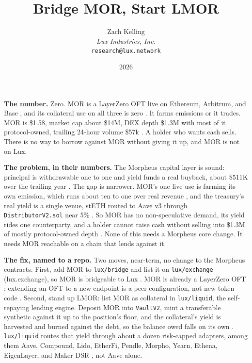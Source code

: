 \documentclass[11pt,a4paper]{article}
\title{Bridge MOR, Start LMOR}
\author{Zach Kelling\\\textit{Lux Industries, Inc.}\\\texttt{research@lux.network}}
\date{2026}
\newcommand{\code}[1]{\texttt{\small #1}}
\newcommand{\prov}[1]{{\color{muted}\scriptsize\sffamily[#1]}}
\begin{document}
\luxcoverpage
\sloppy

\par
\vspace{0.9ex}

\noindent\textbf{The number.}
Zero. MOR is a LayerZero OFT live on Ethereum, Arbitrum, and Base \prov{verified}, and its
collateral use on all three is zero \prov{verified}. It farms emissions or it trades. MOR is
\$1.58, market cap about \$14M, DEX depth \$1.3M with most of it protocol-owned, trailing
24-hour volume \$57k \prov{verified}. A holder who wants cash sells. There is no way to borrow
against MOR without giving it up, and MOR is not on Lux.

\vspace{0.35ex}
\noindent\textbf{The problem, in their numbers.}
The Morpheus capital layer is sound: principal is withdrawable one to one and yield funds a real
buyback, about \$511K over the trailing year \prov{verified}. The gap is narrower. MOR's one live
use is farming its own emission, which runs about ten to one over real revenue \prov{verified}, and
the treasury's real yield is a single venue, stETH routed to Aave v3 through \code{DistributorV2.sol}
near 5\% \prov{verified}. So MOR has no non-speculative demand, its yield rides one counterparty, and
a holder cannot raise cash without selling into \$1.3M of mostly protocol-owned depth \prov{verified}.
None of this needs a Morpheus core change. It needs MOR reachable on a chain that lends against it.

\vspace{0.35ex}
\noindent\textbf{The fix, named to a repo.}
Two moves, near-term, no change to the Morpheus contracts. First, add MOR to \code{lux/bridge} and
list it on \code{lux/exchange} (lux.exchange), so MOR is bridgeable to Lux \prov{verified repo}. MOR
is already a LayerZero OFT \prov{verified}; extending an OFT to a new endpoint is a peer
configuration, not new token code \prov{derived}. Second, stand up LMOR: list MOR as collateral in
\code{lux/liquid}, the self-repaying lending engine. Deposit MOR into \code{VaultV2}, mint a
transferable synthetic against it up to the position's floor, and the collateral's yield is harvested
and burned against the debt, so the balance owed falls on its own \prov{verified repo}.
\code{lux/liquid} routes that yield through about a dozen risk-capped adapters, among them Aave,
Compound, Lido, EtherFi, Pendle, Morpho, Yearn, Ethena, EigenLayer, and Maker DSR
\prov{verified repo}, not Aave alone.
\end{document}
